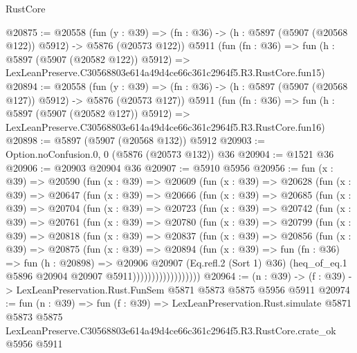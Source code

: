 \begin{lexlean}{RustCore}
\begin{coremodule}
@20875 := @20558
    (fun (y : @39) => (fn : @36) -> (h : @5897 (@5907 (@20568 @122)) @5912) -> @5876 (@20573 @122))
    @5911
    (fun (fn : @36) =>
    fun (h : @5897 (@5907 (@20582 @122)) @5912) =>
    LexLeanPreserve.C30568803e614a49d4ce66c361c2964f5.R3.RustCore.fun15)
@20894 := @20558
    (fun (y : @39) => (fn : @36) -> (h : @5897 (@5907 (@20568 @127)) @5912) -> @5876 (@20573 @127))
    @5911
    (fun (fn : @36) =>
    fun (h : @5897 (@5907 (@20582 @127)) @5912) =>
    LexLeanPreserve.C30568803e614a49d4ce66c361c2964f5.R3.RustCore.fun16)
@20898 := @5897 (@5907 (@20568 @132)) @5912
@20903 := Option.noConfusion.{0, 0} (@5876 (@20573 @132)) @36
@20904 := @1521 @36
@20906 := @20903 @20904 @36
@20907 := @5910 @5956
@20956 := fun (x : @39) =>
  @20590
    (fun (x : @39) =>
    @20609
      (fun (x : @39) =>
      @20628
        (fun (x : @39) =>
        @20647
          (fun (x : @39) =>
          @20666
            (fun (x : @39) =>
            @20685
              (fun (x : @39) =>
              @20704
                (fun (x : @39) =>
                @20723
                  (fun (x : @39) =>
                  @20742
                    (fun (x : @39) =>
                    @20761
                      (fun (x : @39) =>
                      @20780
                        (fun (x : @39) =>
                        @20799
                          (fun (x : @39) =>
                          @20818
                            (fun (x : @39) =>
                            @20837
                              (fun (x : @39) =>
                              @20856
                                (fun (x : @39) =>
                                @20875
                                  (fun (x : @39) =>
                                  @20894
                                    (fun (x : @39) =>
                                    fun (fn : @36) =>
                                    fun (h : @20898) =>
                                    @20906
                                      @20907
                                      (Eq.refl.{2} (Sort 1) @36)
                                      (heq_of_eq.{1} @5896 @20904 @20907 @5911))))))))))))))))))
@20964 := (n : @39) -> (f : @39) -> LexLeanPreservation.Rust.FunSem @5871 @5873 @5875 @5956 @5911
@20974 := fun (n : @39) =>
  fun (f : @39) =>
  LexLeanPreservation.Rust.simulate
    @5871
    @5873
    @5875
    LexLeanPreserve.C30568803e614a49d4ce66c361c2964f5.R3.RustCore.crate_ok
    @5956
    @5911
\end{coremodule}
\end{lexlean}
